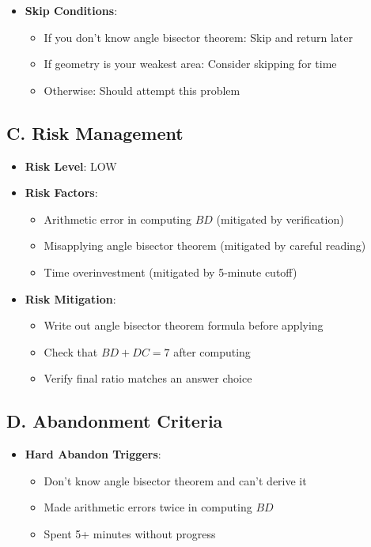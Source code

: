 \documentclass[12pt]{article}
\begin{document}
\begin{competitionbox}
\begin{itemize}[leftmargin=*]
    \item \textbf{Skip Conditions}: 
    \begin{itemize}
        \item If you don't know angle bisector theorem: Skip and return later
        \item If geometry is your weakest area: Consider skipping for time
        \item Otherwise: Should attempt this problem
    \end{itemize}
\end{itemize}

\subsection*{C. Risk Management}
\begin{itemize}[leftmargin=*]
    \item \textbf{Risk Level}: LOW
    
    \item \textbf{Risk Factors}:
    \begin{itemize}
        \item Arithmetic error in computing $BD$ (mitigated by verification)
        \item Misapplying angle bisector theorem (mitigated by careful reading)
        \item Time overinvestment (mitigated by 5-minute cutoff)
    \end{itemize}
    
    \item \textbf{Risk Mitigation}:
    \begin{itemize}
        \item Write out angle bisector theorem formula before applying
        \item Check that $BD + DC = 7$ after computing
        \item Verify final ratio matches an answer choice
    \end{itemize}
\end{itemize}

\subsection*{D. Abandonment Criteria}
\begin{itemize}[leftmargin=*]
    \item \textbf{Hard Abandon Triggers}:
    \begin{itemize}
        \item Don't know angle bisector theorem and can't derive it
        \item Made arithmetic errors twice in computing $BD$
        \item Spent 5+ minutes without progress
    \end{itemize}
    

\end{itemize}
\end{competitionbox}
\end{document}
